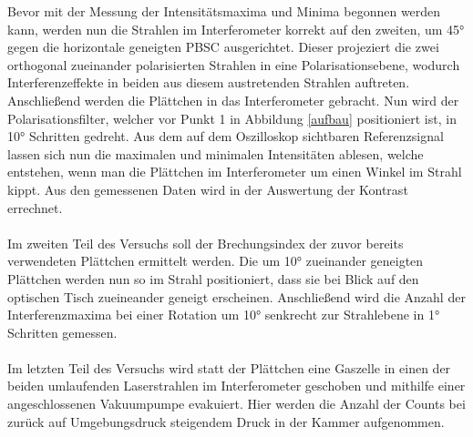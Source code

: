   Bevor mit der Messung der Intensitätsmaxima und Minima begonnen werden kann, werden nun die Strahlen im Interferometer korrekt auf den zweiten, um 45° gegen die horizontale geneigten PBSC ausgerichtet. Dieser projeziert die zwei orthogonal zueinander polarisierten Strahlen in eine Polarisationsebene, wodurch Interferenzeffekte in beiden aus diesem austretenden Strahlen auftreten.\\
  Anschließend werden die Plättchen in das Interferometer gebracht. Nun wird der Polarisationsfilter, welcher vor Punkt 1 in Abbildung \ref{aufbau} positioniert ist,
  in 10° Schritten gedreht.
	Aus dem auf dem Oszilloskop sichtbaren Referenzsignal lassen sich nun die maximalen und minimalen Intensitäten ablesen, welche entstehen, wenn
  man die Plättchen im Interferometer um einen Winkel im Strahl kippt. Aus den gemessenen Daten wird in der Auswertung der Kontrast errechnet.\\
  \\
  Im zweiten Teil des Versuchs soll der Brechungsindex der zuvor bereits verwendeten Plättchen ermittelt werden. Die um 10° zueinander geneigten Plättchen werden nun so im Strahl positioniert, dass sie bei Blick auf den optischen Tisch zueineander geneigt erscheinen.
  Anschließend wird die Anzahl der Interferenzmaxima bei einer Rotation um 10° senkrecht zur Strahlebene in 1° Schritten gemessen.\\
  \\
  Im letzten Teil des Versuchs wird statt der Plättchen eine Gaszelle in einen der beiden umlaufenden Laserstrahlen im Interferometer geschoben und mithilfe einer angeschlossenen Vakuumpumpe evakuiert.
  Hier werden die Anzahl der Counts bei zurück auf Umgebungsdruck steigendem Druck in der Kammer aufgenommen.

